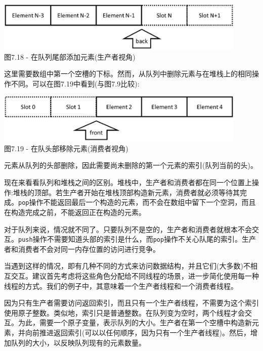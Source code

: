 \begin{center}
\includegraphics[width=0.9\textwidth]{content/2/chapter7/images/18.jpg}\\
图7.18 - 在队列尾部添加元素(生产者视角)
\end{center}

这里需要数组中第一个空槽的下标。然而，从队列中删除元素与在堆栈上的相同操作不同。可以在图7.19中看到(与图7.9比较):

\begin{center}
\includegraphics[width=0.9\textwidth]{content/2/chapter7/images/19.jpg}\\
图7.19 - 在队头部移除元素(消费者视角)
\end{center}

元素从队列的头部删除，因此需要尚未删除的第一个元素的索引(队列当前的头)。

现在来看看队列和堆栈之间的区别。堆栈中，生产者和消费者都在同一个位置上操作:堆栈的顶部。若生产者开始在堆栈顶部构造新元素，消费者就必须等待其完成。\texttt{pop}操作不能返回最后一个构造的元素，而不会在数组中留下一个空洞，而且在构造完成之前，不能返回正在构造的元素。

对于队列来说，情况就不同了。只要队列不是空的，生产者和消费者就根本不会交互。\texttt{push}操作不需要知道头部的索引是什么，而\texttt{pop}操作不关心队尾的索引。生产者和消费者不会对同一内存位置的访问进行竞争。

当遇到这样的情况，即有几种不同的方式来访问数据结构，并且它们(大多数)不相互交互。建议首先考虑将这些角色分配给不同线程的场景，进一步简化使用每一种线程的方式。我们的例子中，其意味着一个生产者线程和一个消费者线程。 

因为只有生产者需要访问返回索引，而且只有一个生产者线程，不需要为这个索引使用原子整数。类似地，索引只是普通整数。在队列变为空时，两个线程才会交互。为此，需要一个原子变量，表示队列的大小。生产者在第一个空槽中构造新元素，并向前推进返回索引(可以以任何顺序，因为只有一个生产者线程)。然后，增加队列的大小，以反映队列现有的元素数量。 

